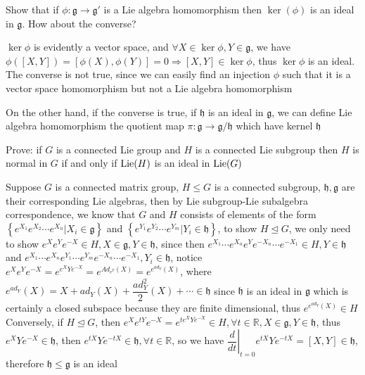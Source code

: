 \documentclass[main]{subfiles}
\newcommand{\<}[1]{\langle #1 \rangle}
\begin{document}
\begin{exercise}
 Show that if $\phi :\mathfrak g \to\mathfrak g'$ is a Lie algebra homomorphism then $\ker(\phi)$ is an ideal in $\mathfrak g$. How about the converse?
\end{exercise}

\begin{solution}
$\ker\phi$ is evidently a vector space, and $\forall X\in\ker\phi, Y\in\mathfrak{g}$, we have $\phi([X,Y])=[\phi(X),\phi(Y)]=0\Rightarrow [X,Y]\in\ker\phi$, thus $\ker\phi$ is an ideal. The converse is not true, since we can easily find an injection $\phi$ such that it is a vector space homomorphism but not a Lie algebra homomorphism \par
On the other hand, if the converse is true, if $\mathfrak{h}$ is an ideal in $\mathfrak{g}$, we can define Lie algebra homomorphism the quotient map $\pi:\mathfrak{g}\rightarrow\mathfrak{g}/\mathfrak{h}$ which have kernel $\mathfrak{h}$ 
\end{solution}

\begin{exercise}
Prove: if $G$ is a connected Lie group and $H$ is a connected Lie subgroup then $H$ is normal in $G$ if and only if $\operatorname{Lie}(H)$ is an ideal in $\operatorname{Lie}(G)$
\end{exercise}

\begin{solution}
Suppose $G$ is a connected matrix group, $H\leq G$ is a connected subgroup, $\mathfrak{h},\mathfrak{g}$ are their corresponding Lie algebras, then by Lie subgroup-Lie subalgebra correspondence, we know that $G$ and $H$ consists of elements of the form $\left\{e^{X_1}e^{X_2}\cdots e^{X_n}|X_i\in\mathfrak{g}\right\}$ and $\left\{e^{Y_1}e^{Y_2}\cdots e^{Y_m}|Y_i\in\mathfrak{h}\right\}$, to show $H\trianglelefteq G$, we only need to show $e^Xe^Ye^{-X}\in H, X\in\mathfrak{g},Y\in\mathfrak{h}$, since then $e^{X_1}\cdots e^{X_n}e^{Y}e^{-X_n}\cdots e^{-X_1}\in H, Y\in\mathfrak{h}$ and $e^{X_1}\cdots e^{X_n}e^{Y_1}\cdots e^{Y_m}e^{-X_n}\cdots e^{-X_1},Y_i\in\mathfrak{h}$, notice $\displaystyle e^Xe^Ye^{-X}=e^{e^XYe^{-X}}=e^{Ad_{e^Y}(X)}=e^{e^{ad_{Y}}(X)}$, where $e^{ad_Y}(X)=X+ad_Y(X)+\dfrac{ad_Y^2}{2}(X)+\cdots\in\mathfrak{h}$ since $\mathfrak{h}$ is an ideal in $\mathfrak{g}$ which is certainly a closed subspace because they are finite dimensional, thus $e^{e^{ad_Y}(X)}\in H$ \\
Conversely, if $H\trianglelefteq G$, then $e^{X}e^{tY}e^{-X}=e^{te^{X}Ye^{-X}}\in H, \forall t\in\mathbb R, X\in\mathfrak{g}, Y\in\mathfrak{h}$, thus $e^{X}Ye^{-X}\in\mathfrak{h}$, then $e^{tX}Ye^{-tX}\in\mathfrak{h}, \forall t\in\mathbb R$, so we have $\left.\dfrac{d}{dt}\right|_{t=0}e^{tX}Ye^{-tX}=[X,Y]\in\mathfrak{h}$, therefore $\mathfrak{h}\leq\mathfrak{g}$ is an ideal
\end{solution}
\end{document}
